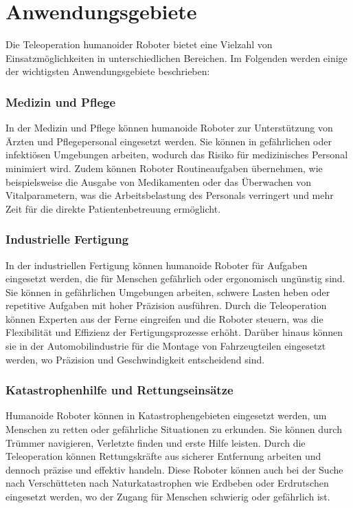 \chapter{Anwendungsgebiete}

Die Teleoperation humanoider Roboter bietet eine Vielzahl von Einsatzmöglichkeiten in unterschiedlichen Bereichen. Im Folgenden werden einige der wichtigsten Anwendungsgebiete beschrieben:

\subsection{Medizin und Pflege}
In der Medizin und Pflege können humanoide Roboter zur Unterstützung von Ärzten und Pflegepersonal eingesetzt werden. Sie können in gefährlichen oder infektiösen Umgebungen arbeiten, wodurch das Risiko für medizinisches Personal minimiert wird. Zudem können Roboter Routineaufgaben übernehmen, wie beispielsweise die Ausgabe von Medikamenten oder das Überwachen von Vitalparametern, was die Arbeitsbelastung des Personals verringert und mehr Zeit für die direkte Patientenbetreuung ermöglicht.

\subsection{Industrielle Fertigung}
In der industriellen Fertigung können humanoide Roboter für Aufgaben eingesetzt werden, die für Menschen gefährlich oder ergonomisch ungünstig sind. Sie können in gefährlichen Umgebungen arbeiten, schwere Lasten heben oder repetitive Aufgaben mit hoher Präzision ausführen. Durch die Teleoperation können Experten aus der Ferne eingreifen und die Roboter steuern, was die Flexibilität und Effizienz der Fertigungsprozesse erhöht. Darüber hinaus können sie in der Automobilindustrie für die Montage von Fahrzeugteilen eingesetzt werden, wo Präzision und Geschwindigkeit entscheidend sind.

\subsection{Katastrophenhilfe und Rettungseinsätze}
Humanoide Roboter können in Katastrophengebieten eingesetzt werden, um Menschen zu retten oder gefährliche Situationen zu erkunden. Sie können durch Trümmer navigieren, Verletzte finden und erste Hilfe leisten. Durch die Teleoperation können Rettungskräfte aus sicherer Entfernung arbeiten und dennoch präzise und effektiv handeln. Diese Roboter können auch bei der Suche nach Verschütteten nach Naturkatastrophen wie Erdbeben oder Erdrutschen eingesetzt werden, wo der Zugang für Menschen schwierig oder gefährlich ist.

